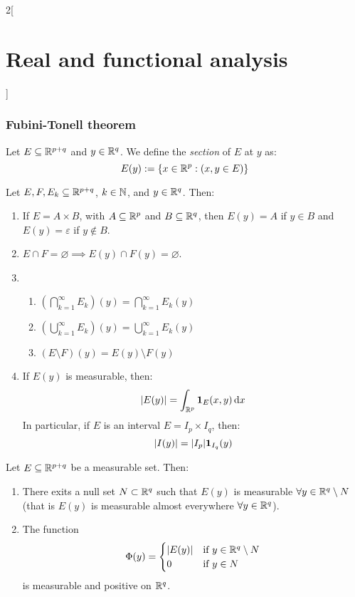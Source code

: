 \documentclass[../../../main_math.tex]{subfiles}
\begin{document}
\begin{multicols}{2}[\section{Real and functional analysis}]
  \subsubsection{Fubini-Tonell theorem}
  \begin{definition}
    Let $E\subseteq\mathbb{R}^{p+q}$ and $y\in\mathbb{R}^q$. We define the \emph{section} of $E$ at $y$ as: $$E(y):=\{x\in\mathbb{R}^p:(x,y\in E)\}$$
  \end{definition}
  \begin{proposition}
    Let $E,F,E_k\subseteq\mathbb{R}^{p+q}$, $k\in\mathbb{N}$, and $y\in\mathbb{R}^q$. Then:
    \begin{enumerate}
      \item If $E= A\times B$, with $A\subseteq \mathbb{R}^p$ and $B\subseteq \mathbb{R}^q$, then $E(y)=A$ if $y\in B$ and $E(y)=\varepsilon$ if $y\notin B$.
      \item $E\cap F=\varnothing\implies E(y)\cap F(y)=\varnothing$.
      \item \hfill\begin{enumerate}
              \item $\displaystyle\left(\bigcap_{k=1}^\infty E_k\right)(y)=\bigcap_{k=1}^\infty E_k(y)$
              \item $\displaystyle\left(\bigcup_{k=1}^\infty E_k\right)(y)=\bigcup_{k=1}^\infty E_k(y)$
              \item $\displaystyle\left(E\setminus F\right)(y)=E(y)\setminus F(y)$
            \end{enumerate}
      \item If $E(y)$ is measurable, then: $$\m{E(y)}=\int_{\RR^p}\indi{E}(x,y)\dd{x}$$ In particular, if $E$ is an interval $E=I_p\times I_q$, then: $$\m{I(y)}=\m{I_p}\indi{I_q}(y)$$
    \end{enumerate}
  \end{proposition}
  \begin{lemma}
    Let $E\subseteq\mathbb{R}^{p+q}$ be a measurable set. Then:
    \begin{enumerate}
      \item There exits a null set $N\subset \mathbb{R}^q$ such that $E(y)$ is measurable $\forall y\in\mathbb{R}^q\setminus N$ (that is $E(y)$ is measurable almost everywhere $\forall y\in\mathbb{R}^q$).
      \item The function $$\Phi(y)=\begin{cases}
                \m{E(y)} & \text{if } y\in\RR^q\setminus N \\
                0        & \text{if } y\in N
              \end{cases}$$ is measurable and positive on $\mathbb{R}^q$.

\end{enumerate}
\end{lemma}
\end{multicols}
\end{document}
